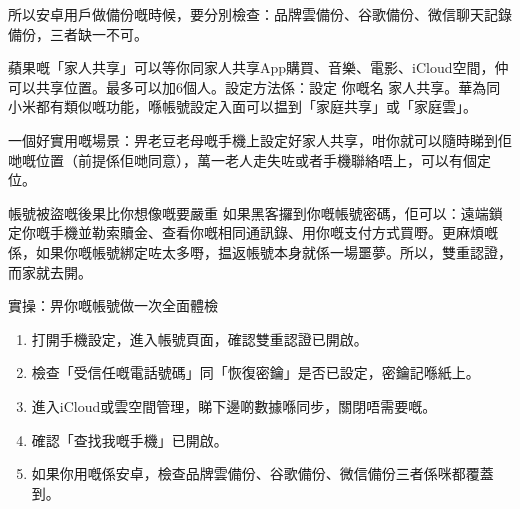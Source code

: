 所以安卓用戶做備份嘅時候，要分別檢查：品牌雲備份、谷歌備份、微信聊天記錄備份，三者缺一不可。


蘋果嘅「家人共享」可以等你同家人共享App購買、音樂、電影、iCloud空間，仲可以共享位置。最多可以加6個人。設定方法係：設定 你嘅名 家人共享。華為同小米都有類似嘅功能，喺帳號設定入面可以揾到「家庭共享」或「家庭雲」。

一個好實用嘅場景：畀老豆老母嘅手機上設定好家人共享，咁你就可以隨時睇到佢哋嘅位置（前提係佢哋同意），萬一老人走失咗或者手機聯絡唔上，可以有個定位。

\begin{tcbwarn}{帳號被盜嘅後果比你想像嘅要嚴重}
如果黑客攞到你嘅帳號密碼，佢可以：遠端鎖定你嘅手機並勒索贖金、查看你嘅相同通訊錄、用你嘅支付方式買嘢。更麻煩嘅係，如果你嘅帳號綁定咗太多嘢，揾返帳號本身就係一場噩夢。所以，雙重認證，而家就去開。

\end{tcbwarn}

\begin{tcbpractice}{實操：畀你嘅帳號做一次全面體檢}
\begin{enumerate}
  \item 打開手機設定，進入帳號頁面，確認雙重認證已開啟。
  \item 檢查「受信任嘅電話號碼」同「恢復密鑰」是否已設定，密鑰記喺紙上。
  \item 進入iCloud或雲空間管理，睇下邊啲數據喺同步，關閉唔需要嘅。
  \item 確認「查找我嘅手機」已開啟。
  \item 如果你用嘅係安卓，檢查品牌雲備份、谷歌備份、微信備份三者係咪都覆蓋到。
\end{enumerate}

\end{tcbpractice}
